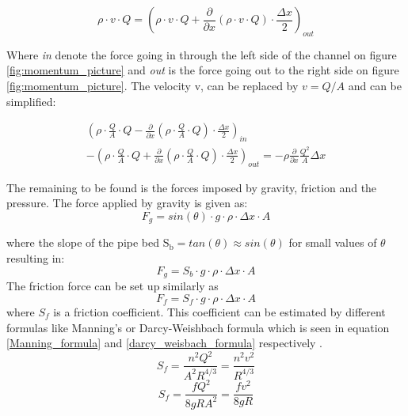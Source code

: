 \begin{equation}
	\rho \cdot v \cdot Q = \left(\rho \cdot v \cdot Q + \frac{\partial}{\partial x}(\rho \cdot v \cdot Q) \cdot \frac{\Delta x}{2}\right)_{out}
\end{equation}

Where \textit{in} denote the force going in through the left side of the channel on figure \ref{fig:momentum_picture} and \textit{out} is the force going out to the right side on figure \ref{fig:momentum_picture}. 
The velocity v, can be replaced by $v =Q/A$ and can be simplified:

\begin{multline}\label{mass_flow_speed}
\left(\rho \cdot \frac{Q}{A} \cdot Q - \frac{\partial}{\partial x}\left(\rho \cdot \frac{Q}{A}  \cdot Q\right) \cdot \frac{\Delta x}{2}\right)_{in} \\ - \left(\rho \cdot \frac{Q}{A}  \cdot Q + \frac{\partial}{\partial x}\left(\rho \cdot \frac{Q}{A}  \cdot Q\right) \cdot \frac{\Delta x}{2} \right)_{out} 
= -  \rho\frac{\partial}{\partial x} \frac{Q^2}{A}\Delta x
\end{multline}

The remaining to be found is the forces imposed by gravity, friction and the pressure.
The force applied by gravity is given as:
\begin{equation}
F_g = sin(\theta)\cdot g \cdot \rho \cdot \Delta x \cdot A
\label{gravity_force} 
\end{equation}

where the slope of the pipe bed $\text{S}_\text{b} = tan(\theta) \approx sin(\theta)$ for small values of $\theta$ resulting in:
\begin{equation}
F_g = S_b \cdot g \cdot \rho \cdot \Delta x \cdot A 
\end{equation}
The friction force can be set up similarly as
\begin{equation}
F_f = S_f \cdot g \cdot \rho \cdot \Delta x \cdot A 
\label{friction_force} 
\end{equation}
where $S_f$ is a friction coefficient. This coefficient can be estimated by different formulas like Manning's or Darcy-Weishbach formula which is seen in equation \ref{Manning_formula} and \ref{darcy_weisbach_formula} respectively . 
\begin{equation}
	S_f = \frac{n^2 Q^2}{A^2R^{4/3}}= \frac{n^2 v^2}{R^{4/3}}
\label{Manning_formula}
\end{equation}
\begin{equation}
	S_f = \frac{f Q^2}{8gR A^2}= \frac{f v^2}{8gR}
\label{darcy_weisbach_formula}
\end{equation}

